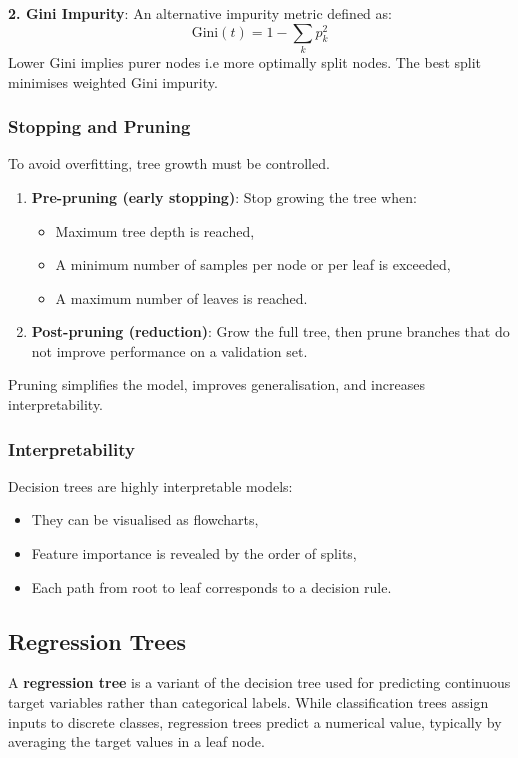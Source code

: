 \documentclass[9pt]{extarticle}
\begin{document}
\textbf{2. Gini Impurity}:  
An alternative impurity metric defined as:
\[
\text{Gini}(t) = 1 - \sum_{k} p_k^2
\]
Lower Gini implies purer nodes i.e more optimally split nodes. The best split minimises weighted Gini impurity.

\subsubsection*{Stopping and Pruning}

To avoid overfitting, tree growth must be controlled.
\begin{enumerate}
    \item \textbf{Pre-pruning (early stopping)}:  
Stop growing the tree when:
\begin{itemize}
    \item Maximum tree depth is reached,
    \item A minimum number of samples per node or per leaf is exceeded,
    \item A maximum number of leaves is reached.
\end{itemize}
\item \textbf{Post-pruning (reduction)}:  
Grow the full tree, then prune branches that do not improve performance on a validation set.

\end{enumerate}



Pruning simplifies the model, improves generalisation, and increases interpretability.

\subsubsection*{Interpretability}

Decision trees are highly interpretable models:
\begin{itemize}
    \item They can be visualised as flowcharts,
    \item Feature importance is revealed by the order of splits,
    \item Each path from root to leaf corresponds to a decision rule.
\end{itemize}

\subsection{Regression Trees}


A \textbf{regression tree} is a variant of the decision tree used for predicting continuous target variables rather than categorical labels. While classification trees assign inputs to discrete classes, regression trees predict a numerical value, typically by averaging the target values in a leaf node.
\end{document}

